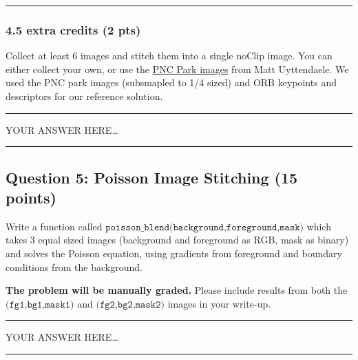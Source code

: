 \documentclass[11pt]{article}
\begin{document}
\begin{center}\rule{0.5\linewidth}{0.5pt}\end{center}

    \hypertarget{extra-credits-2-pts}{%
\subsubsection{4.5 extra credits (2 pts)}\label{extra-credits-2-pts}}

Collect at least 6 images and stitch them into a single noClip image.
You can either collect your own, or use the
\href{http://www.cs.jhu.edu/~misha/Code/SMG/PNC3.zip}{PNC Park images}
from Matt Uyttendaele. We used the PNC park images (subsmapled to 1/4
sized) and ORB keypoints and descriptors for our reference solution.

    \begin{center}\rule{0.5\linewidth}{0.5pt}\end{center}

YOUR ANSWER HERE\ldots{}

\begin{center}\rule{0.5\linewidth}{0.5pt}\end{center}

    \hypertarget{question-5-poisson-image-stitching-15-points}{%
\subsection{Question 5: Poisson Image Stitching (15
points)}\label{question-5-poisson-image-stitching-15-points}}

Write a function called
\(\texttt{poisson_blend(background,foreground,mask)}\) which takes 3
equal sized images (background and foreground as RGB, mask as binary)
and solves the Poisson equation, using gradients from foreground and
boundary conditions from the background.

\textbf{The problem will be manually graded.} Please include results
from both the \(\texttt{(fg1,bg1,mask1)}\) and
\(\texttt{(fg2,bg2,mask2)}\) images in your write-up.

    \begin{center}\rule{0.5\linewidth}{0.5pt}\end{center}

YOUR ANSWER HERE\ldots{}

\begin{center}\rule{0.5\linewidth}{0.5pt}\end{center}


    
    
    
\end{document}
